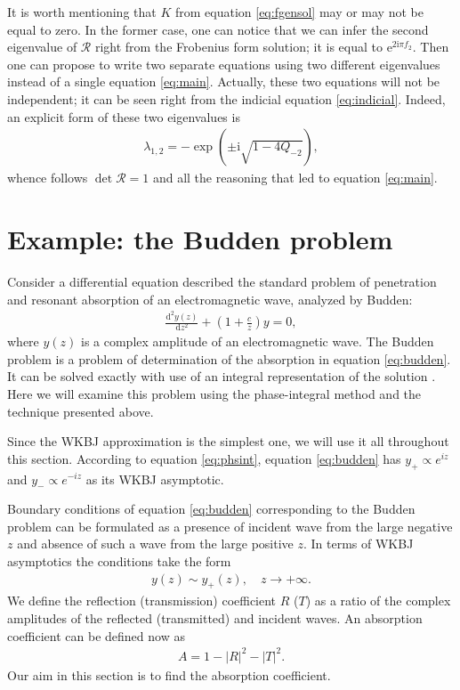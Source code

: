 \documentclass[aip,jmp,reprint]{revtex4-1}
\def\rmi{\mathrm{i}}
\def\rme{\mathrm{e}}
\def\rmd{\mathrm{d}}
\def\R{\bm{\mathcal{R}}}
\begin{document}
It is worth mentioning that $K$ from equation \eqref{eq:fgensol} may or may not be equal to zero. In the
former case, one can notice that we can infer the second eigenvalue of $\R$ right from the
Frobenius form solution; it is equal to $\rme^{2 \rmi \pi f_2}$. Then one can propose to write two
separate equations using two different eigenvalues instead of a single equation \eqref{eq:main}.
Actually, these two equations will not be independent; it can be seen right from the
indicial equation \eqref{eq:indicial}. Indeed, an explicit form of these two eigenvalues is
\begin{eqnarray}
\lambda_{1,2} = - \exp(\pm \rmi \sqrt{1 - 4 Q_{-2}}),
\end{eqnarray}
whence follows $\det\R=1$ and all the reasoning that led to equation \eqref{eq:main}.

\section{Example: the Budden problem \label{sec:budden}}
Consider a differential equation described the standard problem of penetration and 
resonant absorption of an electromagnetic wave, analyzed by Budden:\cite{white-chen,budden}
\begin{eqnarray}
\frac{\rmd^2 y(z)}{\rmd z^2} + \left( 1 + \frac{c}{z} \right) y = 0,  
\label{eq:budden}
\end{eqnarray}
where $y(z)$ is a complex amplitude of an electromagnetic wave.
The Budden problem is a problem of determination of the absorption in equation \eqref{eq:budden}. 
It can be solved exactly with use of an integral representation of the solution \cite{rwbook}.
Here we will examine this problem using the phase-integral method and the technique presented above. 

Since the WKBJ approximation is the simplest one,
we will use it all throughout this section. According to equation \eqref{eq:phsint}, 
equation \eqref{eq:budden} has $y_+ \propto e^{iz}$ and $y_- \propto e^{-iz}$ as its WKBJ asymptotic. 

Boundary conditions of equation \eqref{eq:budden} corresponding to the Budden problem can be
formulated as a presence of incident wave from the large negative $z$ and absence of such 
a wave from the large positive $z$. In terms of WKBJ asymptotics the conditions take the form
\begin{eqnarray}
y(z) \sim y_+(z), \quad z \rightarrow +\infty.  
\label{eq:bbound}
\end{eqnarray}
We define the reflection (transmission) coefficient $R$ ($T$) as
a ratio of the complex amplitudes of the reflected (transmitted) and incident waves. 
An absorption coefficient can be defined now as 
\begin{eqnarray}
A = 1 - |R|^2 - |T|^2.  
\label{eq:absdef}
\end{eqnarray}
Our aim in this section is to find the absorption coefficient.
\end{document}
